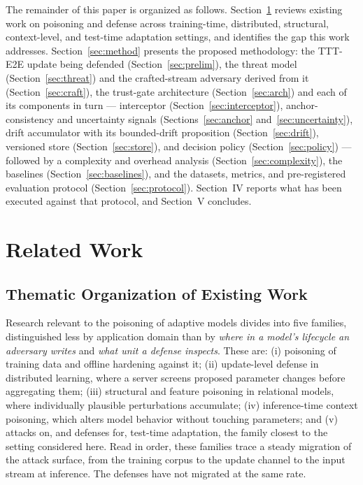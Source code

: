 \documentclass[journal]{IEEEtran}
\begin{document}
The remainder of this paper is organized as follows. Section~\ref{sec:related}
reviews existing work on poisoning and defense across training-time, distributed,
structural, context-level, and test-time adaptation settings, and identifies the gap
this work addresses. Section~\ref{sec:method} presents the proposed methodology: the
TTT-E2E update being defended (Section~\ref{sec:prelim}), the threat model
(Section~\ref{sec:threat}) and the crafted-stream adversary derived from it
(Section~\ref{sec:craft}), the trust-gate architecture (Section~\ref{sec:arch}) and
each of its components in turn --- interceptor (Section~\ref{sec:interceptor}),
anchor-consistency and uncertainty signals (Sections~\ref{sec:anchor}
and~\ref{sec:uncertainty}), drift accumulator with its bounded-drift proposition
(Section~\ref{sec:drift}), versioned store (Section~\ref{sec:store}), and decision
policy (Section~\ref{sec:policy}) --- followed by a complexity and overhead analysis
(Section~\ref{sec:complexity}), the baselines (Section~\ref{sec:baselines}), and the
datasets, metrics, and pre-registered evaluation protocol
(Section~\ref{sec:protocol}). Section~IV reports what has been executed against
that protocol, and Section~V concludes.

\section{Related Work}
\label{sec:related}

\subsection{Thematic Organization of Existing Work}

Research relevant to the poisoning of adaptive models divides into five families,
distinguished less by application domain than by \emph{where in a model's lifecycle
an adversary writes} and \emph{what unit a defense inspects}. These are: (i)
poisoning of training data and offline hardening against it; (ii) update-level
defense in distributed learning, where a server screens proposed parameter changes
before aggregating them; (iii) structural and feature poisoning in relational
models, where individually plausible perturbations accumulate; (iv) inference-time
context poisoning, which alters model behavior without touching parameters; and (v)
attacks on, and defenses for, test-time adaptation, the family closest to the
setting considered here. Read in order, these families trace a steady migration of
the attack surface, from the training corpus to the update channel to the input
stream at inference. The defenses have not migrated at the same rate.
\end{document}

